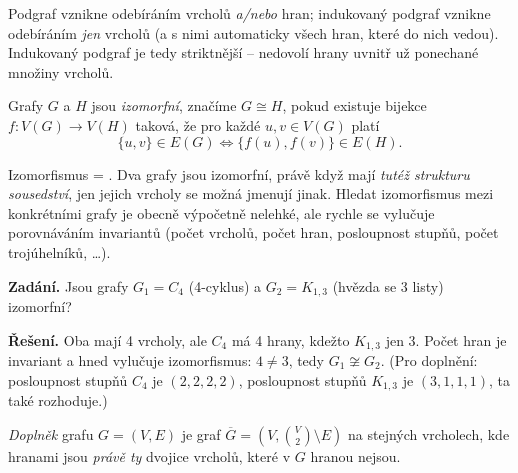 \documentclass[11pt,a4paper]{article}
\begin{document}
\begin{intuice}
Podgraf vznikne odebíráním vrcholů \emph{a/nebo} hran; indukovaný podgraf vznikne odebíráním \emph{jen} vrcholů (a s nimi automaticky všech hran, které do nich vedou). Indukovaný podgraf je tedy striktnější -- nedovolí  hrany uvnitř už ponechané množiny vrcholů.
\end{intuice}

\begin{definice}
Grafy $G$ a $H$ jsou \emph{izomorfní}, značíme $G\cong H$, pokud existuje bijekce $f\colon V(G)\to V(H)$ taková, že pro každé $u,v\in V(G)$ platí
\[ \{u,v\}\in E(G)\iff\{f(u),f(v)\}\in E(H). \]
\end{definice}

\begin{intuice}
Izomorfismus = . Dva grafy jsou izomorfní, právě když mají \emph{tutéž strukturu sousedství}, jen jejich vrcholy se možná jmenují jinak. Hledat izomorfismus mezi konkrétními grafy je obecně výpočetně nelehké, ale rychle se vylučuje porovnáváním invariantů (počet vrcholů, počet hran, posloupnost stupňů, počet trojúhelníků, \dots).
\end{intuice}

\begin{priklad}
\textbf{Zadání.} Jsou grafy $G_1=C_4$ (4-cyklus) a $G_2=K_{1,3}$ (hvězda se 3 listy) izomorfní?

\textbf{Řešení.} Oba mají 4 vrcholy, ale $C_4$ má 4 hrany, kdežto $K_{1,3}$ jen 3. Počet hran je invariant a hned vylučuje izomorfismus: $4\ne 3$, tedy $G_1\not\cong G_2$. (Pro doplnění: posloupnost stupňů $C_4$ je $(2,2,2,2)$, posloupnost stupňů $K_{1,3}$ je $(3,1,1,1)$, ta také rozhoduje.)
\end{priklad}

\begin{definice}
\emph{Doplněk} grafu $G=(V,E)$ je graf $\overline{G}=(V,\binom{V}{2}\setminus E)$ na stejných vrcholech, kde hranami jsou \emph{právě ty} dvojice vrcholů, které v $G$ hranou nejsou.
\end{definice}

\begin{center}
\end{center}
\end{document}
